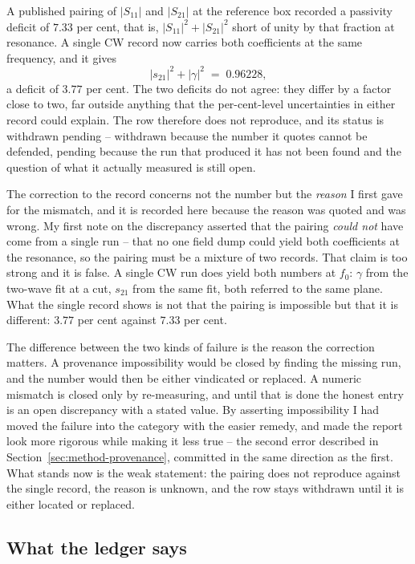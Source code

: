 A published pairing of $|S_{11}|$ and $|S_{21}|$ at the reference box recorded a passivity deficit of $7.33$ per
cent, that is, $|S_{11}|^2 + |S_{21}|^2$ short of unity by that fraction at resonance. A single CW record now
carries both coefficients at the same frequency, and it gives
\begin{equation}
  |s_{21}|^{2} + |\gamma|^{2} \;=\; 0.96228 ,
  \label{eq:worked-passivity}
\end{equation}
a deficit of $3.77$ per cent. The two deficits do not agree: they differ by a factor close to two, far outside
anything that the per-cent-level uncertainties in either record could explain. The row therefore does not
reproduce, and its status is withdrawn pending -- withdrawn because the number it quotes cannot be defended,
pending because the run that produced it has not been found and the question of what it actually measured is
still open.

The correction to the record concerns not the number but the \emph{reason} I first gave for the mismatch, and it
is recorded here because the reason was quoted and was wrong. My first note on the discrepancy asserted that the
pairing \emph{could not} have come from a single run -- that no one field dump could yield both coefficients at
the resonance, so the pairing must be a mixture of two records. That claim is too strong and it is false. A
single CW run does yield both numbers at $f_0$: $\gamma$ from the two-wave fit at a cut, $s_{21}$ from the same
fit, both referred to the same plane. What the single record shows is not that the pairing is impossible but
that it is different: $3.77$ per cent against $7.33$ per cent.

The difference between the two kinds of failure is the reason the correction matters. A provenance
impossibility would be closed by finding the missing run, and the number would then be either vindicated or
replaced. A numeric mismatch is closed only by re-measuring, and until that is done the honest entry is an open
discrepancy with a stated value. By asserting impossibility I had moved the failure into the category with the
easier remedy, and made the report look more rigorous while making it less true -- the second error described in
Section~\ref{sec:method-provenance}, committed in the same direction as the first. What stands now is the weak
statement: the pairing does not reproduce against the single record, the reason is unknown, and the row stays
withdrawn until it is either located or replaced.

\subsection{What the ledger says}
\label{sec:worked-lessons}

